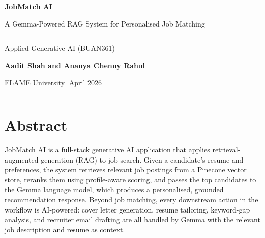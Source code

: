 \documentclass[11pt]{article}
\begin{document}

\begin{titlepage}
  \centering
  \vspace*{2.2cm}
  {\Huge\bfseries JobMatch AI\par}
  \vspace{0.45cm}
  {\large\color{slategray} A Gemma-Powered RAG System for Personalised Job Matching\par}
  \vspace{1.8cm}
  {\color{rulecol}\rule{0.65\linewidth}{0.5pt}\par}
  \vspace{0.9cm}
  {\normalsize Applied Generative AI (BUAN361)\par}
  \vspace{0.5cm}
  {\normalsize\bfseries Aadit Shah \quad and \quad Ananya Chenny Rahul\par}
  \vspace{0.5cm}
  {\normalsize FLAME University \quad|\quad April 2026\par}
  \vspace{0.9cm}
  {\color{rulecol}\rule{0.65\linewidth}{0.5pt}\par}
  \vfill
\end{titlepage}

\tableofcontents
\clearpage
{}

\section*{Abstract}

JobMatch AI is a full-stack generative AI application that applies retrieval-augmented generation (RAG) to job search. Given a candidate's resume and preferences, the system retrieves relevant job postings from a Pinecone vector store, reranks them using profile-aware scoring, and passes the top candidates to the Gemma language model, which produces a personalised, grounded recommendation response. Beyond job matching, every downstream action in the workflow is AI-powered: cover letter generation, resume tailoring, keyword-gap analysis, and recruiter email drafting are all handled by Gemma with the relevant job description and resume as context.
\end{document}
